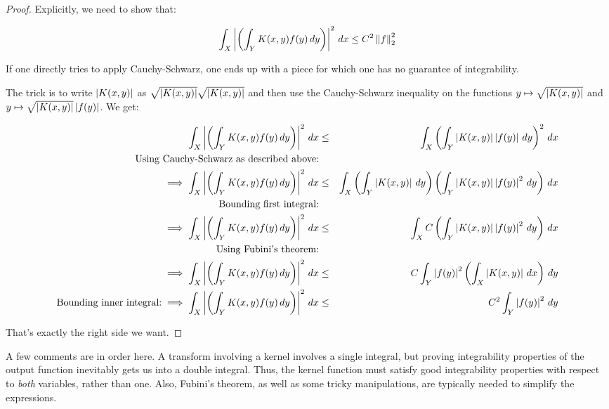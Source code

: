 \documentclass[a4paper]{amsart}
\newcommand{\norm}[1]{\left\|#1\right\|}
\begin{document}
\begin{proof}
  Explicitly, we need to show that:

  $$\int_X \abs{\left(\int_Y K(x,y) f(y) \, dy \right)}^2 \, dx \le C^2 \norm{f}_2^2$$

  If one directly tries to apply Cauchy-Schwarz, one ends up with a
  piece for which one has no guarantee of integrability. 

  The trick is to write $\left|K(x,y)\right|$ as
  $\sqrt{\left|K(x,y)\right|}\sqrt{\left|K(x,y)\right|}$ and then use the
  Cauchy-Schwarz inequality on the functions $y \mapsto
  \sqrt{\left|K(x,y)\right|}$ and $y \mapsto \sqrt{\left|K(x,y)\right|}\left|f(y)\right|$. We get:

  \begin{eqnarray*}
    \int_X\left|\left(\int_Y K(x,y) f(y) \, dy \right)\right|^2 \, dx & \le & \int_X \left(\int_Y \left|K(x,y)\right|\left|f(y)\right| \, dy \right)^2 \, dx\\
    \text{Using Cauchy-Schwarz as described above:}\\
    \implies \int_X\left|\left(\int_Y K(x,y) f(y) \, dy \right)\right|^2 \, dx & \le & \int_X \left(\int_Y \left|K(x,y)\right| \, dy \right) \left(\int_Y \left|K(x,y)\right| \left|f(y)\right|^2 \, dy \right) \, dx\\
    \text{Bounding first integral:}\\
    \implies \int_X\left|\left(\int_Y K(x,y) f(y) \, dy \right)\right|^2 \, dx & \le & \int_X C \left(\int_Y \left|K(x,y)\right| \left|f(y)\right|^2 \, dy \right) \, dx\\
    \text{Using Fubini's theorem:}\\
    \implies \int_X\left|\left(\int_Y K(x,y) f(y) \, dy \right)\right|^2 \, dx & \le &C \int_Y \left|f(y)\right|^2 \left(\int_X \left|K(x,y)\right| \, dx\right) \, dy\\
    \text{Bounding inner integral:}
    \implies\int_X\left|\left(\int_Y K(x,y) f(y) \, dy \right)\right|^2 \, dx & \le & C^2 \int_Y \left|f(y)\right|^2 \, dy
  \end{eqnarray*}

  That's exactly the right side we want.
\end{proof}

A few comments are in order here. A transform involving a kernel
involves a single integral, but proving integrability properties of
the output function inevitably gets us into a double integral. Thus,
the kernel function must satisfy good integrability properties with
respect to {\em both} variables, rather than one. Also, Fubini's
theorem, as well as some tricky manipulations, are typically needed to
simplify the expressions.
\end{document}
